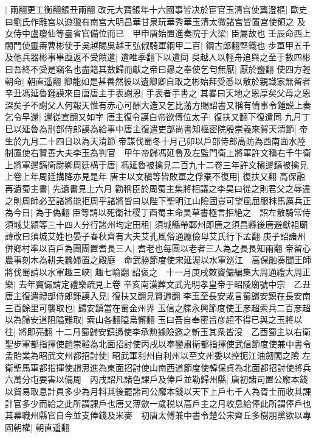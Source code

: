 |{
	兩翻更工衡翻鋹丑兩翻}
改元大寶鋹年十六國事皆决於宦官玉清宫使龔澄樞|{
	歐史曰劉氏作離宫以遊獵有南宫大明昌華甘泉玩華秀華玉清太微諸宫皆置宫使領之}
及女侍中盧瓊仙等臺省官備位而已　甲申唐始置進奏院于大梁|{
	臣屬故也}
壬辰命西上閤門使靈夀曹彬使于吳越賜吳越王弘俶騎軍鋼甲二百|{
	鋼古郎翻堅鐵也}
步軍甲五千及他兵器彬事畢亟返不受饋遺|{
	遺唯季翻下以遺同}
吳越人以輕舟追與之至于數四彬曰吾終不受是竊名也盡籍其數歸而獻之帝曰曏之奉使乞匄無厭|{
	厭於鹽翻}
使四方輕朝命|{
	朝直遥翻}
卿能如是甚善然彼以遺卿卿自取之彬始拜受悉以散於親識家無留者辛丑馮延魯鍾謨來自唐唐主手表謝恩|{
	手表者手書之}
其畧曰天地之恩厚矣父母之恩深矣子不謝父人何報天惟有赤心可酬大造又乞比藩方賜詔書又稱有情事令鍾謨上奏乞令早還|{
	還從宣翻又如字}
唐主復令謨白帝欲傳位太子|{
	復扶又翻下復遣同}
九月丁巳以延魯為刑部侍郎謨為給事中唐主復遣吏部尚書知樞密院殷崇義來賀天清節|{
	帝生於九月二十四日以為天清節}
帝謀伐蜀冬十月己卯以戶部侍郎高防為西南面水陸制置使右贊善大夫李玉為判官　甲午帝歸馮延魯及左監門衛上將軍許文稹右千牛衛上將軍邊鎬衛尉卿周廷構于唐|{
	馮延魯被擒見二百九十二卷三年許文稹邊鎬被擒見上卷上年周廷搆降亦見是年}
唐主以文稹等皆敗軍之俘棄不復用|{
	復扶又翻}
高保融再遺蜀主書|{
	先遺書見上六月}
勸稱臣於周蜀主集將相議之李昊曰從之則君父之辱違之則周師必至諸將能拒周乎諸將皆曰以陛下聖明江山險固豈可望風屈服秣馬厲兵正為今日|{
	為于偽翻}
臣等請以死衛社稷丁酉蜀主命昊草書極言拒絶之　詔左散騎常侍須城艾潁等三十四人分行諸州均定田租|{
	須城縣帶鄆州即唐之須昌縣後唐避獻祖廟諱改曰須城艾姓也晏子春秋齊有大夫艾孔風俗通龎儉母艾氏行下孟翻}
庚子詔諸州併鄉村率以百戶為團團置耆長三人|{
	耆老也每團以老者三人為之長長知兩翻}
帝留心農事刻木為耕夫蠶婦置之殿庭　命武勝節度使宋延渥以水軍廵江　高保融奏聞王師將伐蜀請以水軍趣三峽|{
	趣七喻翻}
詔褒之　十一月庚戌敇竇儼編集大周通禮大周正樂|{
	去年竇儼請定禮樂疏見上卷}
辛亥南漢葬文武光明孝皇帝于昭陵廟號中宗　乙丑唐主復遣禮部侍郎鍾謨入見|{
	復扶又翻見賢遍翻}
李玉至長安或言蜀歸安鎮在長安南三百餘里可襲取也|{
	歸安鎮當在蜀金州界}
玉信之牒永興節度使王彦超索兵二百彦超以為歸安道阻隘難取|{
	索山各翻隘烏懈翻}
玉曰吾自奉密旨彦超不得已與之玉將以往|{
	將即亮翻}
十二月蜀歸安鎮遏使李承勲據險邀之斬玉其衆皆沒　乙酉蜀主以右衛聖步軍都指揮使趙崇韜為北面招討使丙戌以奉鑾肅衛都指揮使武信節度使兼中書令孟貽業為昭武文州都招討使|{
	昭武軍利州自利州以至文州委以控扼江油劒閣之險}
左衛聖馬軍都指揮使趙思進為東面招討使山南西道節度使韓保貞為北面都招討使將兵六萬分屯要害以備周　丙戌詔凡諸色課戶及俸戶並勒歸州縣|{
	唐初諸司置公廨本錢以貿易取息計員多少為月料其後罷諸司公廨本錢以天下上戶七千人為胥士而收其課計官多少而給之此所謂課戶也唐又薄歛一歲税以高戶主之月收息給俸此所謂俸戶也}
其幕職州縣官自今並支俸錢及米麥　初唐太傅兼中書令楚公宋齊丘多樹朋黨欲以專固朝權|{
	朝直遥翻}
